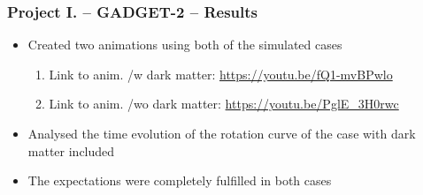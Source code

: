 \begin{frame}
\frametitle{Project I. -- GADGET-2 -- Results}
\begin{itemize}
	\item<1-> Created two animations using both of the simulated cases
	\begin{enumerate}
		\item<1-> Link to anim. /w dark matter: \url{https://youtu.be/fQ1-mvBPwlo}
		\item<1-> Link to anim. /wo dark matter: \url{https://youtu.be/PglE_3H0rwc}
	\end{enumerate}
	\item<1-> Analysed the time evolution of the rotation curve of the case with dark matter included
	\item<1-> The expectations were completely fulfilled in both cases 
\end{itemize}

\end{frame}